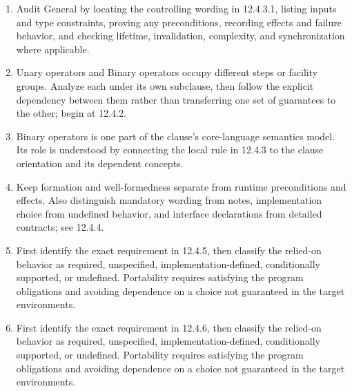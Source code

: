 \documentclass[11pt,letterpaper]{article}
\begin{document}
\begin{enumerate}
\item Audit General by locating the controlling wording in 12.4.3.1, listing inputs and type constraints, proving any preconditions, recording effects and failure behavior, and checking lifetime, invalidation, complexity, and synchronization where applicable.
\item Unary operators and Binary operators occupy different steps or facility groups. Analyze each under its own subclause, then follow the explicit dependency between them rather than transferring one set of guarantees to the other; begin at 12.4.2.
\item Binary operators is one part of the clause's core-language semantics model. Its role is understood by connecting the local rule in 12.4.3 to the clause orientation and its dependent concepts.
\item Keep formation and well-formedness separate from runtime preconditions and effects. Also distinguish mandatory wording from notes, implementation choice from undefined behavior, and interface declarations from detailed contracts; see 12.4.4.
\item First identify the exact requirement in 12.4.5, then classify the relied-on behavior as required, unspecified, implementation-defined, conditionally supported, or undefined. Portability requires satisfying the program obligations and avoiding dependence on a choice not guaranteed in the target environments.
\item First identify the exact requirement in 12.4.6, then classify the relied-on behavior as required, unspecified, implementation-defined, conditionally supported, or undefined. Portability requires satisfying the program obligations and avoiding dependence on a choice not guaranteed in the target environments.
\end{enumerate}
\end{document}
